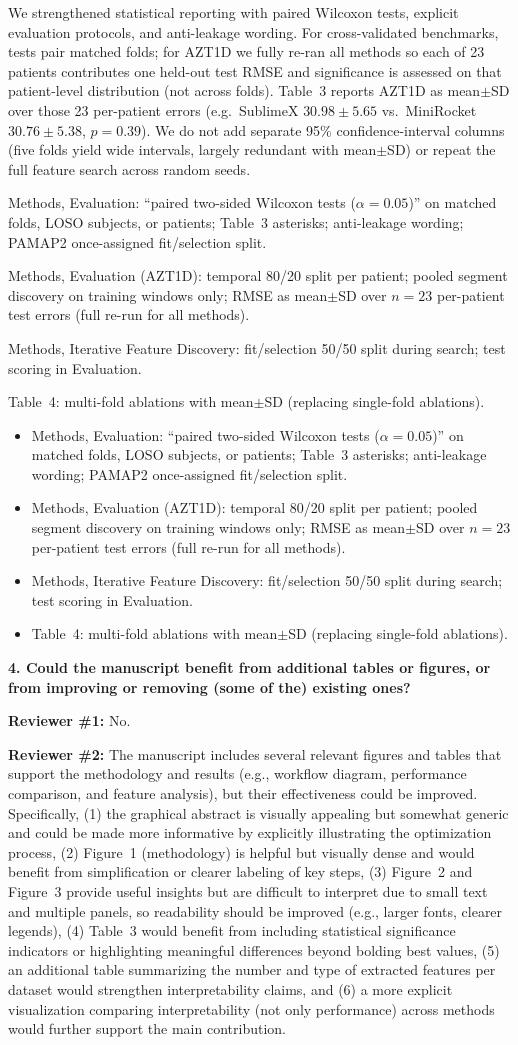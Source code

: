 \documentclass[11pt]{article}
\makeatletter
\newcommand{\rsp}{\par\vspace{0.9em}}
\newcommand{\rcbothq}[3]{%
  \begin{reviewerbox}\textbf{#1}\par\smallskip\textbf{Reviewer \#1:} #2\par\smallskip%
  \textbf{Reviewer \#2:} #3\end{reviewerbox}}
\newcommand{\response}[2]{%
  \begin{responsebox}#1%
  \def\@responseitems{#2}%
  \ifx\@responseitems\empty\else\begin{itemize}[nosep,leftmargin=1.2em]#2\end{itemize}\fi
  \end{responsebox}\rsp}
\makeatother
\begin{document}
\response{We strengthened statistical reporting with paired Wilcoxon tests, explicit evaluation
protocols, and anti-leakage wording. For cross-validated benchmarks, tests pair matched folds;
for AZT1D we fully re-ran all methods so each of 23 patients contributes one held-out test RMSE
and significance is assessed on that patient-level distribution (not across folds). Table~3 reports
AZT1D as mean$\pm$SD over those 23 per-patient errors (e.g.\ SublimeX $30.98 \pm 5.65$ vs.\
MiniRocket $30.76 \pm 5.38$, $p{=}0.39$). We do not add separate 95\% confidence-interval columns
(five folds yield wide intervals, largely redundant with mean$\pm$SD) or repeat the full feature
search across random seeds.}{
  \item Methods, Evaluation: ``paired two-sided Wilcoxon tests ($\alpha{=}0.05$)'' on matched
    folds, LOSO subjects, or patients; Table~3 asterisks; anti-leakage wording; PAMAP2
    once-assigned fit/selection split.
  \item Methods, Evaluation (AZT1D): temporal 80/20 split per patient; pooled segment discovery
    on training windows only; RMSE as mean$\pm$SD over $n{=}23$ per-patient test errors (full
    re-run for all methods).
  \item Methods, Iterative Feature Discovery: fit/selection 50/50 split during search; test scoring
    in Evaluation.
  \item Table~4: multi-fold ablations with mean$\pm$SD (replacing single-fold ablations).
}

\rcbothq{4. Could the manuscript benefit from additional tables or figures, or from improving or
removing (some of the) existing ones?}{No.}
{The manuscript includes several relevant figures and tables that support the methodology and
results (e.g., workflow diagram, performance comparison, and feature analysis), but their
effectiveness could be improved.
Specifically, (1) the graphical abstract is visually appealing but somewhat generic and could be
made more informative by explicitly illustrating the optimization process, (2) Figure~1
(methodology) is helpful but visually dense and would benefit from simplification or clearer
labeling of key steps, (3) Figure~2 and Figure~3 provide useful insights but are difficult to
interpret due to small text and multiple panels, so readability should be improved (e.g., larger
fonts, clearer legends), (4) Table~3 would benefit from including statistical significance
indicators or highlighting meaningful differences beyond bolding best values, (5) an additional
table summarizing the number and type of extracted features per dataset would strengthen
interpretability claims, and (6) a more explicit visualization comparing interpretability (not
only performance) across methods would further support the main contribution.}
\end{document}
